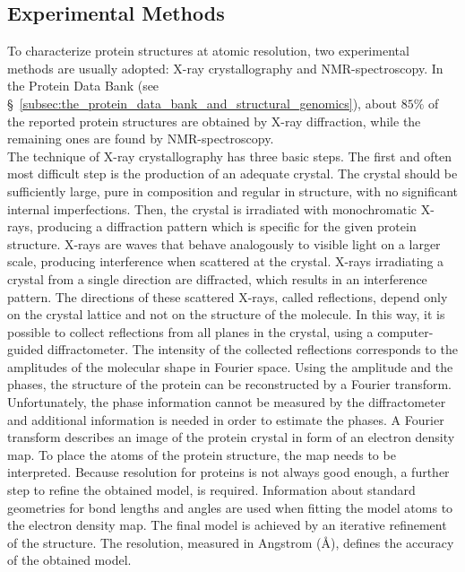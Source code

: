 \subsection{Experimental Methods}
\label{subsec:experimental_methods}
To characterize protein structures at atomic resolution, two experimental methods are usually adopted: X-ray crystallography and NMR-spectroscopy. In the Protein Data Bank (see \S~\ref{subsec:the_protein_data_bank_and_structural_genomics}), about $85\%$ of the reported protein structures are obtained by X-ray diffraction, while the remaining ones are found by NMR-spectroscopy.\\
The technique of X-ray crystallography has three basic steps. The first and often most difficult step is the production of an adequate crystal. The crystal should be sufficiently large, pure in composition and regular in structure, with no significant internal imperfections. Then, the crystal is irradiated with monochromatic X-rays, producing a diffraction pattern which is specific for the given protein structure. X-rays are waves that behave analogously to visible light on a larger scale, producing interference when scattered at the crystal. X-rays irradiating a crystal from a single direction are diffracted, which results in an interference pattern. The directions of these scattered X-rays, called reflections, depend only on the crystal lattice and not on the structure of the molecule. In this way, it is possible to collect reflections from all planes in the crystal, using a computer-guided diffractometer. The intensity of the collected reflections corresponds to the amplitudes of the molecular shape in Fourier space. Using the amplitude and the phases, the structure of the protein can be reconstructed by a Fourier transform. Unfortunately, the phase information cannot be measured by the diffractometer and additional information is needed in order to estimate the phases. A Fourier transform describes an image of the protein crystal in form of an electron density map. To place the atoms of the protein structure, the map needs to be interpreted. Because resolution for proteins is not always good enough, a further step to refine the obtained model, is required. Information about standard geometries for bond lengths and angles are used when fitting the model atoms to the electron density map. The final model is achieved by an iterative refinement of the structure. The resolution, measured in Angstrom (\AA{}), defines the accuracy of the obtained model. \\

